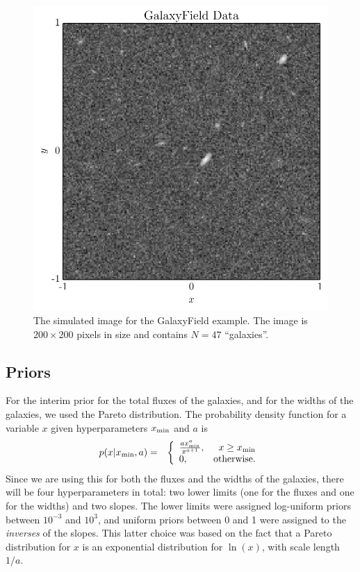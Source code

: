 \documentclass[letterpaper, 11pt]{article}
\begin{document}
\begin{figure}
\begin{center}
\includegraphics[scale=0.7]{galaxyfield_data.pdf}
\caption{The simulated image for the GalaxyField example. The image is
$200\times 200$ pixels in size and contains $N=47$ ``galaxies''.
\label{fig:galaxyfield_data}}
\end{center}
\end{figure}

\subsection{Priors}
For the interim prior for the total fluxes of the galaxies, and for the
widths of the galaxies, we used the Pareto
distribution. The probability density function for a variable $x$ given
hyperparameters $x_{\rm min}$ and $a$ is
\begin{eqnarray}
p(x | x_{\rm min}, a) &=&
\left\{
\begin{array}{lr}
\frac{a x_{\rm min}^{a}}{x^{a + 1}}, & x \geq x_{\rm min}\\
0, & \textnormal{otherwise.}
\end{array}
\right.
\end{eqnarray}
Since we are using this for both the fluxes and the widths of the galaxies,
there will be four hyperparameters in total: two lower limits (one for the
fluxes and one for the widths) and two slopes. The lower limits were assigned
log-uniform priors between $10^{-3}$ and $10^3$, and uniform priors between 0
and 1 were assigned to the {\it inverses} of the slopes. This latter choice
was based on the fact that a Pareto distribution for $x$ is an exponential
distribution for $\ln(x)$, with scale length $1/a$.
\end{document}
